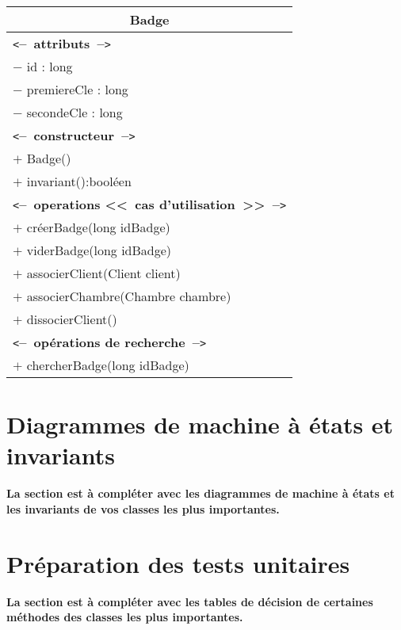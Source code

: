 \documentclass[11pt,article]{article}
\newcommand{\cmt}[1]{\texttt{<}\textbf{--~#1~--}\texttt{>}}
\begin{document}
  \begin{center}
	  \begin{longtable}{|p{15cm}|}
		  \hline
		  \multicolumn{1}{|c|}{{\Large \textsf{Badge}}} \\
		  \hline
		  \cmt{attributs}\\
		  $-$ id : long \\
		  $-$ premiereCle : long \\
		  $-$ secondeCle : long \\
		  \hline
		  \cmt{constructeur} \\
		  $+$ Badge()\\
		  $+$ invariant():booléen\\
		  \cmt{operations <<~cas d'utilisation~>>} \\
		  $+$ créerBadge(long idBadge) \\
		  $+$ viderBadge(long idBadge) \\
		  $+$ associerClient(Client client) \\
		  $+$ associerChambre(Chambre chambre) \\
		  $+$ dissocierClient() \\
		  \cmt{opérations de recherche} \\
		  $+$ chercherBadge(long idBadge) \\
		  \hline
	  \end{longtable}%
  \end{center}


\newpage

\section{Diagrammes de machine à états et invariants}

{\color{red}\textbf{La section est à compléter avec les diagrammes de
    machine à états et les invariants de vos classes les plus
    importantes.}}

\newpage

\section{Préparation des tests unitaires}

{\color{red}\textbf{La section est à compléter avec les tables de
    décision de certaines méthodes des classes les plus importantes.}}
\end{document}
